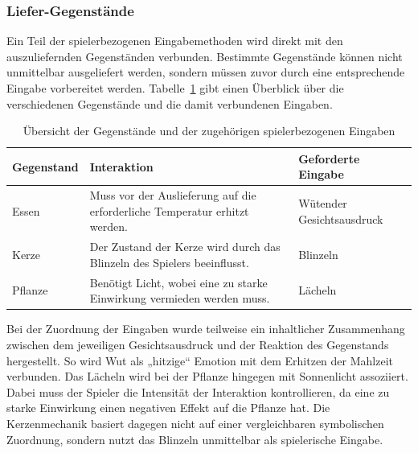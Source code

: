 \documentclass[intern]{cgMA}
\begin{document}
\subsubsection{Liefer-Gegenstände}
Ein Teil der spielerbezogenen Eingabemethoden wird direkt mit den auszuliefernden Gegenständen verbunden. Bestimmte Gegenstände können nicht unmittelbar ausgeliefert werden, sondern müssen zuvor durch eine entsprechende Eingabe vorbereitet werden. Tabelle~\ref{tab:gegenstaende} gibt einen Überblick über die verschiedenen Gegenstände und die damit verbundenen Eingaben.
\begin{table}[H]
    \centering
    \caption{Übersicht der Gegenstände und der zugehörigen spielerbezogenen Eingaben}
    \label{tab:gegenstaende}
    \begin{tabularx}{\textwidth}{l X X}
        \hline
        \textbf{Gegenstand} & \textbf{Interaktion} & \textbf{Geforderte Eingabe} \\
        \hline

        Essen &
        Muss vor der Auslieferung auf die erforderliche Temperatur erhitzt werden. &
        Wütender Gesichtsausdruck \\

        Kerze &
        Der Zustand der Kerze wird durch das Blinzeln des Spielers beeinflusst. &
        Blinzeln \\

        Pflanze &
        Benötigt Licht, wobei eine zu starke Einwirkung vermieden werden muss. &
        Lächeln \\
        
        \hline
    \end{tabularx}
\end{table}
Bei der Zuordnung der Eingaben wurde teilweise ein inhaltlicher Zusammenhang zwischen dem jeweiligen Gesichtsausdruck und der Reaktion des Gegenstands hergestellt. So wird Wut als „hitzige“ Emotion mit dem Erhitzen der Mahlzeit verbunden. Das Lächeln wird bei der Pflanze hingegen mit Sonnenlicht assoziiert. Dabei muss der Spieler die Intensität der Interaktion kontrollieren, da eine zu starke Einwirkung einen negativen Effekt auf die Pflanze hat. Die Kerzenmechanik basiert dagegen nicht auf einer vergleichbaren symbolischen Zuordnung, sondern nutzt das Blinzeln unmittelbar als spielerische Eingabe.
\end{document}

